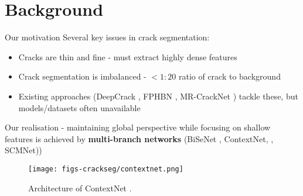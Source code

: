 \documentclass{libs/curtin_format}
\begin{document}
\section{Background}

\begin{frame}{Our motivation}
\vspace{0.1cm}
    Several key issues in crack segmentation:
    \begin{itemize}
        \item Cracks are thin and fine - must extract highly dense features
        \item Crack segmentation is imbalanced - $<1:20$ ratio of crack to background
        \item Existing approaches (DeepCrack \cite{liu2019deepcrack}, FPHBN \cite{yang2019feature}, MR-CrackNet \cite{nayyeri2021multi}) tackle these, but models/datasets often unavailable
    \end{itemize}
    Our realisation - maintaining global perspective while focusing on shallow features is achieved by \textbf{multi-branch networks} (BiSeNet \cite{yu2018bisenet}, ContextNet, \cite{poudel2018contextnet}, SCMNet)\cite{singha2021scmnet})
    \begin{figure}
        \centering
        \texttt{[image: figs-crackseg/contextnet.png]}
        \caption{Architecture of ContextNet \cite{poudel2018contextnet}.}
        \label{fig:farme2}
    \end{figure}
\end{frame}
\end{document}
